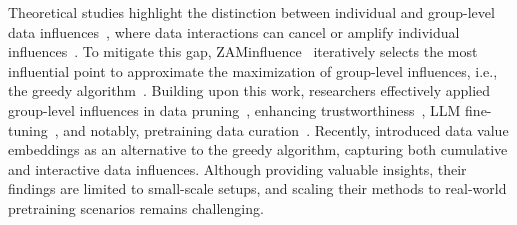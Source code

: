 

Theoretical studies highlight the distinction between individual and group-level data influences~\cite{koh2019accuracy,saunshi2022understanding}, where data interactions can cancel or amplify individual influences~\cite{hu2024most,huang2024approximations}. To mitigate this gap, ZAMinfluence~\cite{broderick2020automatic} iteratively selects the most influential point to approximate the maximization of group-level influences, i.e., the greedy algorithm~\cite{nemhauser1978analysis}. Building upon this work, researchers effectively applied group-level influences in data pruning~\cite{yang2023dataset}, enhancing trustworthiness~\cite{wang2022understanding,sattigeri2022fair,chhabra2024data}, LLM fine-tuning~\cite{guu2023simfluence}, and notably, pretraining data curation~\cite{wang2023farewell,wang2024greats}. 
Recently, \citet{wang2024capturing} introduced data value embeddings as an alternative to the greedy algorithm, capturing both cumulative and interactive data influences.
Although providing valuable insights, their findings are limited to small-scale setups, and scaling their methods to real-world pretraining scenarios remains challenging.

